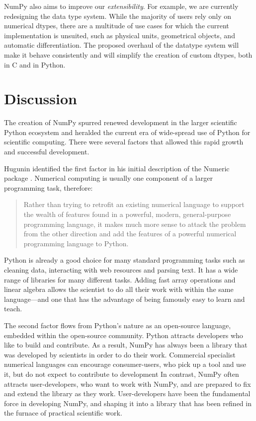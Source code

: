 NumPy also aims to improve our \emph{extensibility}.
For example, we are currently redesigning the data type system.
While the majority of users rely only on numerical dtypes, there are a
multitude of use cases for which the current implementation is unsuited, such
as physical units\cite{astropy,Goldbaum2018,pint}, geometrical
objects\cite{pygeos}, and automatic differentiation\cite{pyadolc}.
The proposed overhaul of the datatype system will make it behave consistently
and will simplify the creation of custom dtypes, both in C and in Python.


\section*{Discussion}



The creation of NumPy spurred renewed development in the larger scientific
Python ecosystem and heralded the current era of wide-spread use of Python for
scientific computing.
There were several factors that allowed this rapid growth
and successful development.

Hugunin identified the first factor in his initial description of the Numeric
package \cite{Hugunin-whitepaper}.  Numerical computing is usually one
component of a larger programming task, therefore:
\begin{quote}
    Rather than trying to retrofit an existing numerical language to support
    the wealth of features found in a powerful, modern, general-purpose
    programming language, it makes much more sense to attack the problem from
    the other direction and add the features of a powerful numerical
    programming language to Python.
\end{quote}
Python is already a good choice for many standard programming tasks such as
cleaning data, interacting with web resources and parsing text.  It has a wide
range of libraries for many different tasks. Adding fast array operations and
linear algebra allows the scientist to do all their work with within the same
language---and one that has the advantage of being famously easy to learn and
teach.

The second factor flows from Python's nature as an open-source language,
embedded within the open-source community.  Python attracts developers who like
to build and contribute.  As a result, NumPy has always been a library that was
developed by scientists in order to do their work.  Commercial specialist
numerical languages can encourage consumer-users, who pick up a tool and use
it, but do not expect to contribute to development%
In contrast, NumPy often
attracts user-developers, who want to work with NumPy, and are prepared to fix
and extend the library as they work. User-developers have been the fundamental
force in developing NumPy, and shaping it into a library that has been refined
in the furnace of practical scientific work.

